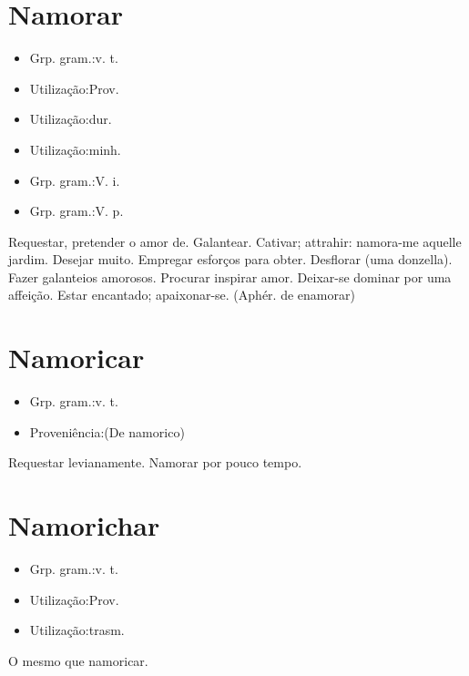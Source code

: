 \section{Namorar}
\begin{itemize}
\item {Grp. gram.:v. t.}
\end{itemize}
\begin{itemize}
\item {Utilização:Prov.}
\end{itemize}
\begin{itemize}
\item {Utilização:dur.}
\end{itemize}
\begin{itemize}
\item {Utilização:minh.}
\end{itemize}
\begin{itemize}
\item {Grp. gram.:V. i.}
\end{itemize}
\begin{itemize}
\item {Grp. gram.:V. p.}
\end{itemize}
Requestar, pretender o amor de.
Galantear.
Cativar; attrahir: \textunderscore namora-me aquelle jardim\textunderscore .
Desejar muito.
Empregar esforços para obter.
Desflorar (uma donzella).
Fazer galanteios amorosos.
Procurar inspirar amor.
Deixar-se dominar por uma affeição.
Estar encantado; apaixonar-se.
(Aphér. de \textunderscore enamorar\textunderscore )
\section{Namoricar}
\begin{itemize}
\item {Grp. gram.:v. t.}
\end{itemize}
\begin{itemize}
\item {Proveniência:(De \textunderscore namorico\textunderscore )}
\end{itemize}
Requestar levianamente.
Namorar por pouco tempo.
\section{Namorichar}
\begin{itemize}
\item {Grp. gram.:v. t.}
\end{itemize}
\begin{itemize}
\item {Utilização:Prov.}
\end{itemize}
\begin{itemize}
\item {Utilização:trasm.}
\end{itemize}
O mesmo que \textunderscore namoricar\textunderscore .
